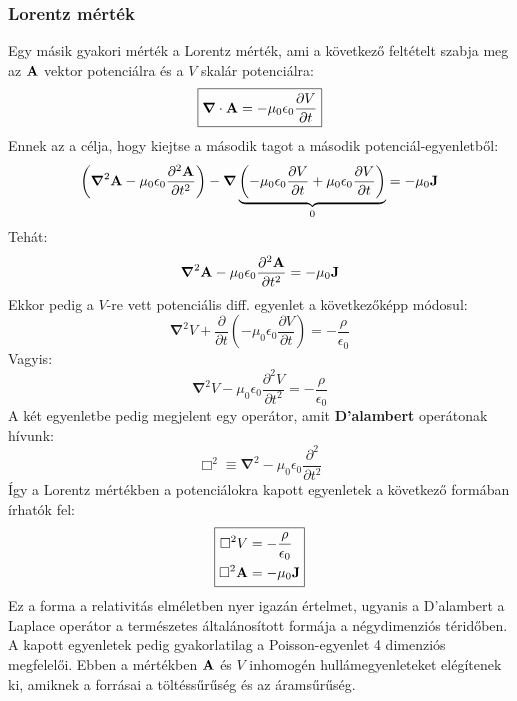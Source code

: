 \documentclass[a4paper,12pt]{article}
\begin{document}
\subsubsection{Lorentz mérték}
Egy másik gyakori mérték a Lorentz mérték, ami a következő feltételt szabja meg az $\bold{A}$ vektor potenciálra és a $V$ skalár potenciálra:
\begin{equation}
    \boxed{\boldsymbol{\nabla} \cdot \bold{A} = - \mu_0 \epsilon_0 \frac{\partial V}{\partial t}}
\end{equation}
Ennek az a célja, hogy kiejtse a második tagot a második potenciál-egyenletből:
\begin{equation}
    \left(\boldsymbol{\nabla}^2 \bold{A} - \mu_0 \epsilon_0 \frac{\partial^2 \bold{A}}{\partial t^2}\right) - \boldsymbol{\nabla} \underbrace{\left(- \mu_0 \epsilon_0 \frac{\partial V}{\partial t} + \mu_0 \epsilon_0 \frac{\partial V}{\partial t}\right)}_{0} = - \mu_0 \bold{J}
\end{equation}
Tehát:
\begin{equation}
    \boldsymbol{\nabla}^2 \bold{A} - \mu_0 \epsilon_0 \frac{\partial^2 \bold{A}}{\partial t^2} = - \mu_0 \bold{J}
\end{equation}
Ekkor pedig a $V$-re vett potenciális diff. egyenlet a következőképp módosul:
\begin{equation}
    \boldsymbol{\nabla}^2 V + \frac{\partial }{\partial t} \left(- \mu_0 \epsilon_0 \frac{\partial V}{\partial t}\right) = - \frac{\rho}{\epsilon_0}
\end{equation}
Vagyis:
\begin{equation}
    \boldsymbol{\nabla}^2 V - \mu_0 \epsilon_0 \frac{\partial^2 V}{\partial t^2} = - \frac{\rho}{\epsilon_0}
\end{equation}
A két egyenletbe pedig megjelent egy operátor, amit \textbf{D'alambert} operátonak hívunk:
\begin{equation}
    \boxed{\Box^2 \equiv \boldsymbol{\nabla}^2 - \mu_0 \epsilon_0 \frac{\partial^2 }{\partial t^2}}
\end{equation}
Így a Lorentz mértékben a potenciálokra kapott egyenletek a következő formában írhatók fel:
\begin{equation}
    \boxed{\begin{aligned}
        \Box^2 V &= - \frac{\rho}{\epsilon_0} \\
        \Box^2 \bold{A} &= - \mu_0 \bold{J}
    \end{aligned}}
\end{equation}
Ez a forma a relativitás elméletben nyer igazán értelmet, ugyanis a D'alambert a Laplace operátor a természetes általánosított formája a négydimenziós téridőben. A kapott egyenletek pedig gyakorlatilag
a Poisson-egyenlet 4 dimenziós megfelelői. Ebben a mértékben $\bold{A}$ és $V$ inhomogén hullámegyenleteket elégítenek ki, amiknek a forrásai a töltéssűrűség és az áramsűrűség.
\end{document}
